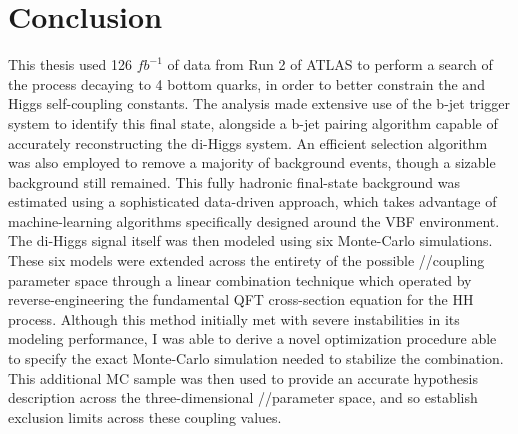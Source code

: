 \chapter{Conclusion}\label{chapter:conclusion}

This thesis used 126 $\textit{fb}^{-1}$ of data from Run 2 of ATLAS
    to perform a search of the \hhproc process decaying to 4 bottom quarks,
    in order to better constrain the \kl and \kvv Higgs self-coupling constants.
The analysis made extensive use of the b-jet trigger system to identify this final state,
    alongside a b-jet pairing algorithm capable of accurately reconstructing the di-Higgs system.
An efficient selection algorithm was also employed to remove a majority of background events,
    though a sizable background still remained.
This fully hadronic final-state background was estimated using a sophisticated data-driven approach,
    which takes advantage of machine-learning algorithms specifically designed around the VBF environment.
The di-Higgs signal itself was then modeled using six Monte-Carlo simulations.
These six models were extended across the entirety of the possible \kvv/\kl/\kvv coupling parameter space
    through a linear combination technique
    which operated by reverse-engineering the fundamental QFT cross-section equation for the HH process.
Although this method initially met with severe instabilities in its modeling performance,
    I was able to derive a novel optimization procedure able to specify
    the exact Monte-Carlo simulation needed to stabilize the combination.
This additional MC sample was then used to provide an accurate hypothesis description across
    the three-dimensional \kvv/\kl/\kv parameter space,
    and so establish exclusion limits across these coupling values. 

